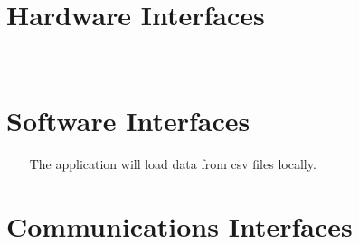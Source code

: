\documentclass{report}
\begin{document}


\section{Hardware Interfaces} ~~~

\section{Software Interfaces} ~~~
The application will load data from csv files locally.


\section{Communications Interfaces} ~~~
\end{document}
